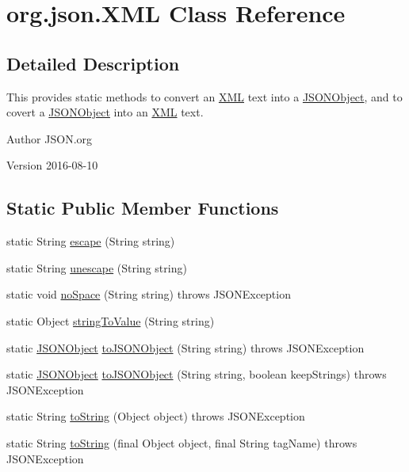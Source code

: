 \hypertarget{classorg_1_1json_1_1XML}{\section{org.\-json.\-X\-M\-L Class Reference}
\label{classorg_1_1json_1_1XML}
}


\subsection{Detailed Description}
This provides static methods to convert an \hyperlink{classorg_1_1json_1_1XML}{X\-M\-L} text into a \hyperlink{classorg_1_1json_1_1JSONObject}{J\-S\-O\-N\-Object}, and to covert a \hyperlink{classorg_1_1json_1_1JSONObject}{J\-S\-O\-N\-Object} into an \hyperlink{classorg_1_1json_1_1XML}{X\-M\-L} text.

\begin{DoxyAuthor}{Author}
J\-S\-O\-N.\-org 
\end{DoxyAuthor}
\begin{DoxyVersion}{Version}
2016-\/08-\/10 
\end{DoxyVersion}
\subsection*{Static Public Member Functions}
\begin{DoxyCompactItemize}
\item 
static String \hyperlink{classorg_1_1json_1_1XML_ac7d1541b807c9c09526495fa16ab0d75}{escape} (String string)
\item 
static String \hyperlink{classorg_1_1json_1_1XML_a3779686c76836cb761d6250f846cd5d6}{unescape} (String string)
\item 
static void \hyperlink{classorg_1_1json_1_1XML_a433875e54b5e562f14878e3e51b0caf4}{no\-Space} (String string)  throws J\-S\-O\-N\-Exception 
\item 
static Object \hyperlink{classorg_1_1json_1_1XML_ab49caaac2a830d8aa44ab26382c318f6}{string\-To\-Value} (String string)
\item 
static \hyperlink{classorg_1_1json_1_1JSONObject}{J\-S\-O\-N\-Object} \hyperlink{classorg_1_1json_1_1XML_a31c7e87a06107fc3ec5c9a3eba318d18}{to\-J\-S\-O\-N\-Object} (String string)  throws J\-S\-O\-N\-Exception 
\item 
static \hyperlink{classorg_1_1json_1_1JSONObject}{J\-S\-O\-N\-Object} \hyperlink{classorg_1_1json_1_1XML_adc7fcc544f604a5b55148bf3a042042c}{to\-J\-S\-O\-N\-Object} (String string, boolean keep\-Strings)  throws J\-S\-O\-N\-Exception 
\item 
static String \hyperlink{classorg_1_1json_1_1XML_a4d4cd79a68a991f50707b87a7a23d02b}{to\-String} (Object object)  throws J\-S\-O\-N\-Exception 
\item 
static String \hyperlink{classorg_1_1json_1_1XML_a063dd278b1f6a2167ac57d8226c899b0}{to\-String} (final Object object, final String tag\-Name)  throws J\-S\-O\-N\-Exception 
\end{DoxyCompactItemize}
